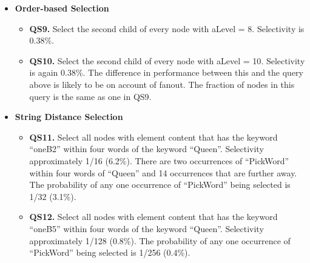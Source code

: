 \begin {itemize}
\item {\bf Order-based Selection}
\begin{itemize}
\item
{\bf QS9.} Select the second child of every node with {\sf aLevel = 8}.
Selectivity is 0.38\%.  
\item
{\bf QS10.} Select the second child of every node with {\sf aLevel = 10}.
Selectivity is again 0.38\%.  The difference in performance between
this and the query above is likely to be on account of fanout. The fraction
of nodes in this query is the same as one in QS9.
\end{itemize}
\item {\bf String Distance Selection}
\begin{itemize}
\item
{\bf QS11.} Select all nodes with element content that has the keyword {\sf
``oneB2''} within four words of the keyword {\sf
``Queen''}. Selectivity approximately 1/16 (6.2\%).
There are two occurrences of ``PickWord'' within four words of {\sf ``Queen''} and
14 occurrences that are further away.  The probability of any one
occurrence of ``PickWord'' being selected is 1/32 (3.1\%).
\item
{\bf QS12.} Select all nodes with element content that has the keyword {\sf
``oneB5''} within four words of the keyword {\sf ``Queen''}.
Selectivity approximately 1/128 (0.8\%).
The probability of any one occurrence of ``PickWord'' being selected 
 is 1/256 (0.4\%).
\end{itemize}
\end{itemize}


